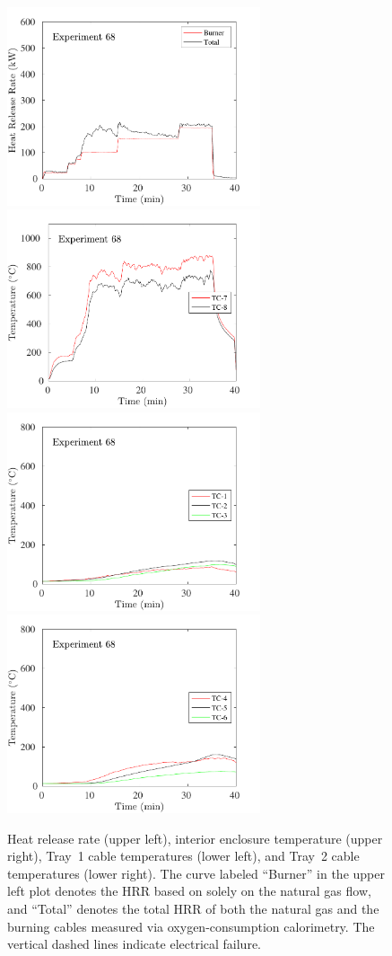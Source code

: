 \begin{figure}[H]
\includegraphics[height=2.30in]{../SCRIPT_FIGURES/Test_68_HRR} \hfill
\includegraphics[height=2.30in]{../SCRIPT_FIGURES/Test_68_TC_7-8} \\
\includegraphics[height=2.30in]{../SCRIPT_FIGURES/Test_68_TC_1-3} \hfill
\includegraphics[height=2.30in]{../SCRIPT_FIGURES/Test_68_TC_4-6}
\caption[HRR and temperatures of Experiment 68]{Heat release rate (upper left), interior enclosure temperature (upper right), Tray~1 cable temperatures (lower left), and Tray~2 cable temperatures (lower right). The curve labeled ``Burner'' in the upper left plot denotes the HRR based on solely on the natural gas flow, and ``Total'' denotes the total HRR of both the natural gas and the burning cables measured via oxygen-consumption calorimetry. The vertical dashed lines indicate electrical failure.}
\label{fig:Test_68}
\end{figure}

